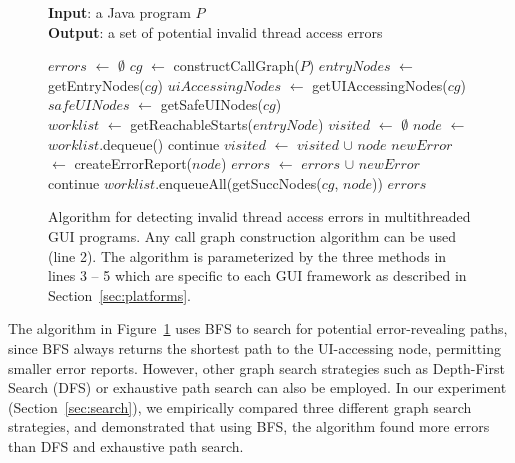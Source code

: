 \begin{figure}[t]
\textbf{Input}: a Java program $\mathit{P}$\\
\textbf{Output}: a set of potential invalid thread access errors\\
\vspace{-4mm}
\begin{algorithmic}[1]
\STATE $\mathit{errors}$ $\leftarrow$ $\emptyset$ 
\STATE $\mathit{cg}$ $\leftarrow$ constructCallGraph($\mathit{P}$)
\STATE $\mathit{entryNodes}$ $\leftarrow$ getEntryNodes($\mathit{cg}$)
\STATE $\mathit{uiAccessingNodes}$ $\leftarrow$ getUIAccessingNodes($\mathit{cg}$)
\STATE $\mathit{safeUINodes}$ $\leftarrow$ getSafeUINodes($\mathit{cg}$)\\
\STATE $\mathit{worklist}$ $\leftarrow$ getReachableStarts($\mathit{entryNode}$)
\STATE $\mathit{visited}$ $\leftarrow$ $\emptyset$
\STATE $\mathit{node}$ $\leftarrow$ $\mathit{worklist}$.dequeue()
\STATE continue
\ENDIF
\STATE $\mathit{visited}$ $\leftarrow$ $\mathit{visited}$ $\cup$ $\mathit{node}$
\STATE $\mathit{newError}$ $\leftarrow$ createErrorReport($\mathit{node}$)
\STATE $\mathit{errors}$ $\leftarrow$ $\mathit{errors}$ $\cup$ $\mathit{newError}$
\STATE continue
\ELSE
\STATE $\mathit{worklist}$.enqueueAll(getSuccNodes($\mathit{cg}$, $\mathit{node}$))
\ENDIF 
\ENDWHILE
\ENDFOR
\RETURN $errors$
\vspace{-2mm}
\end{algorithmic}
\caption{Algorithm for detecting invalid thread access errors in multithreaded GUI programs. 
Any call graph construction algorithm can be used (line 2). The algorithm
is parameterized by the three methods in lines 3 -- 5 which are specific to each GUI framework
 as described in Section~\ref{sec:platforms}.
} \label{fig:detectalgorithm}
\end{figure}

The algorithm in Figure~\ref{fig:detectalgorithm} uses BFS to search
for potential error-revealing paths, since BFS always returns the
shortest path to the UI-accessing node, permitting
smaller error reports. However,
other graph search strategies such as Depth-First Search (DFS) or
exhaustive path search can also be employed. In our experiment (Section~\ref{sec:search}),
we empirically compared three different graph search strategies, and demonstrated that
using BFS, the algorithm found more errors than DFS and
exhaustive path search.


